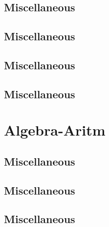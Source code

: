 \subsection{Miscellaneous}
\raggedbottom
\vspace{-.7\baselineskip}\hrulefill
\vspace{0.1\baselineskip}\subsection{Miscellaneous}
\raggedbottom
\vspace{-.7\baselineskip}\hrulefill
\vspace{0.1\baselineskip}\subsection{Miscellaneous}
\raggedbottom
\vspace{-.7\baselineskip}\hrulefill
\vspace{0.1\baselineskip}\subsection{Miscellaneous}
\raggedbottom
\vspace{-.7\baselineskip}\hrulefill
\vspace{0.1\baselineskip}
\section{Algebra-Aritm}
\subsection{Miscellaneous}
\raggedbottom
\vspace{-.7\baselineskip}\hrulefill
\vspace{0.1\baselineskip}\subsection{Miscellaneous}
\raggedbottom
\vspace{-.7\baselineskip}\hrulefill
\vspace{0.1\baselineskip}\subsection{Miscellaneous}
\raggedbottom
\vspace{-.7\baselineskip}\hrulefill
\vspace{0.1\baselineskip}
